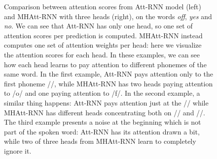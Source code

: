 \begin{figure}[h!]
	\caption{Comparison between attention scores from  Att-RNN model (left) and MHAtt-RNN with three heads (right), on the words \textit{off}, \textit{yes} and \textit{no}. We can see that Att-RNN has only one head, so one set of attention scores per prediction is computed. MHAtt-RNN instead computes one set of attention weights per head: here we visualize the attention scores for each head. In these examples, we can see how each head learns to pay attention to different phonemes of the same word. In the first example, Att-RNN pays attention only to the first phoneme //, while MHAtt-RNN has two heads paying attention to /o/ and one paying attention to /f/. In the second example, a similar thing happens: Att-RNN pays attention just at the // while MHAtt-RNN has different heads concentrating both on // and //. The third example presents a noise at the beginning which is not part of the spoken word: Att-RNN has its attention drawn a bit, while two of three heads from MHAtt-RNN learn to completely ignore it.}
	\label{fig:att_scores}
\end{figure}

